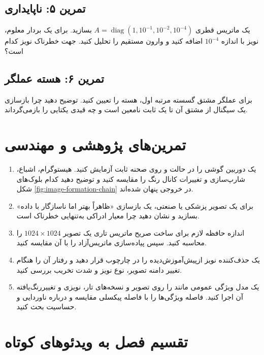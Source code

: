 \documentclass[12pt,openany,oneside]{book}
\begin{document}
\subsection*{تمرین ۵: ناپایداری}
یک ماتریس قطری \(A=\operatorname{diag}(1,10^{-1},10^{-2},10^{-4})\) بسازید. برای یک بردار معلوم،
نویز با اندازه \(10^{-4}\) اضافه کنید و وارون مستقیم را تحلیل کنید. جهت خطرناک نویز کدام است؟

\subsection*{تمرین ۶: هسته عملگر}
برای عملگر مشتق گسسته مرتبه اول، هسته را تعیین کنید. توضیح دهید چرا بازسازی یک سیگنال از مشتق آن
تا یک ثابت نامعین است و چه قیدی یکتایی را بازمی‌گرداند.

\section{تمرین‌های پژوهشی و مهندسی}

\begin{enumerate}
\item یک دوربین گوشی را در حالت  و  روی صحنه ثابت آزمایش کنید. هیستوگرام، اشباع،
شارپ‌سازی و تغییرات کانال رنگ را مقایسه کنید و توضیح دهید کدام بلوک‌های شکل \ref{fig:image-formation-chain}
در خروجی  پنهان شده‌اند.
\item برای یک تصویر پزشکی یا صنعتی، یک بازسازی «ظاهراً بهتر اما ناسازگار با داده» بسازید و نشان دهید
چرا معیار ادراکی به‌تنهایی خطرناک است.
\item اندازه حافظه لازم برای ساخت صریح ماتریس تاری یک تصویر \(1024\times1024\) را محاسبه کنید.
سپس پیاده‌سازی ماتریس‌آزاد را با آن مقایسه کنید.
\item یک حذف‌کننده نویز ازپیش‌آموزش‌دیده را در چارچوب  قرار دهید و رفتار آن را هنگام تغییر دامنه تصویر،
نوع نویز و شدت تخریب بررسی کنید.
\item یک مدل ویژگی عمومی مانند  را روی تصویر و نسخه‌های تار، نویزی و تغییررنگ‌یافته آن اجرا کنید.
فاصله ویژگی‌ها را با فاصله پیکسلی مقایسه و درباره ناوردایی و حساسیت بحث کنید.
\end{enumerate}

\section{تقسیم فصل به ویدئوهای کوتاه}
\end{document}
